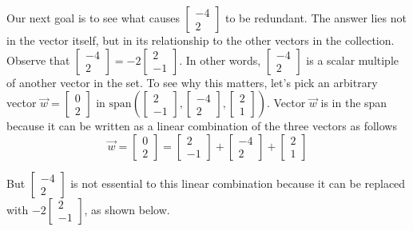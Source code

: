 \documentclass{ximera}
\begin{document}
Our next goal is to see what causes $\begin{bmatrix}-4\\2\end{bmatrix}$ to be redundant.  The answer lies not in the vector itself, but in its relationship to the other vectors in the collection. Observe that $\begin{bmatrix}-4\\2\end{bmatrix}=-2\begin{bmatrix}2\\-1\end{bmatrix}$.  In other words, $\begin{bmatrix}-4\\2\end{bmatrix}$ is a scalar multiple of another vector in the set.  To see why this matters, let's pick an arbitrary vector $\vec{w}=\begin{bmatrix}0\\2\end{bmatrix}$ in $\mbox{span}\left(\begin{bmatrix}2\\-1\end{bmatrix}, \begin{bmatrix}-4\\2\end{bmatrix}, \begin{bmatrix}2\\1\end{bmatrix}\right)$.  Vector $\vec{w}$ is in the span because it can be written as a linear combination of the three vectors as follows
$$\vec{w}=\begin{bmatrix}0\\2\end{bmatrix}=\begin{bmatrix}2\\-1\end{bmatrix}+ \begin{bmatrix}-4\\2\end{bmatrix}+ \begin{bmatrix}2\\1\end{bmatrix}$$

But $\begin{bmatrix}-4\\2\end{bmatrix}$ is not essential to this linear combination because it can be replaced with $-2\begin{bmatrix}2\\-1\end{bmatrix}$, as shown below.
\end{document}
